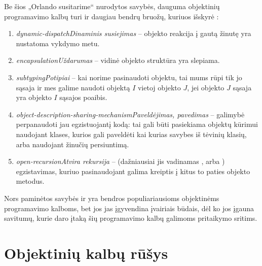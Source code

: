 Be šios „Orlando susitarime“ nurodytos savybės, dauguma
objektinių programavimo kalbų turi ir daugiau bendrų bruožų,
kuriuos išskyrė \cite[225-227]{types-and-programming-languages}:
\begin{enumerate}
  \item \emph{\gls{dynamic-dispatch}{Dinaminis susiejimas}} –
    objekto reakcija į gautą žinutę yra nustatoma vykdymo metu.
  \item \emph{\gls{encapsulation}{Uždarumas}} – vidinė objekto
    struktūra yra slepiama.
  \item \emph{\gls{subtyping}{Potipiai}} – kai norime pasinaudoti objektu, 
    tai mums rūpi tik jo sąsaja ir mes galime naudoti objektą $I$ vietoj
    objekto $J$, jei objekto $J$ sąsaja yra objekto $I$ sąsajos poaibis.
  \item \emph{\gls{object-description-sharing-mechanism}{Paveldėjimas,
    pavedimas}} – galimybė perpanaudoti jau egzistuojantį kodą: tai
    gali būti pasiekiama objektų kūrimui naudojant klases, kurios
    gali paveldėti kai kurias savybes iš tėvinių klasių, arba
    naudojant žinučių persiuntimą.
  \item \emph{\gls{open-recursion}{Atvira rekursija}} –
    (dažniausiai jis vadinamas , arba )
    egzistavimas, kuriuo pasinaudojant galima kreiptis į kitus to
    paties objekto metodus.
\end{enumerate}
Nors paminėtos savybės ir yra bendros populiariausioms objektinėms
programavimo kalboms, bet jos jas
 įgyvendina įvairiais būdais, dėl ko jos įgauna
savitumų, kurie daro įtaką šių programavimo kalbų galimoms
pritaikymo sritims.

\section{Objektinių kalbų rūšys}

